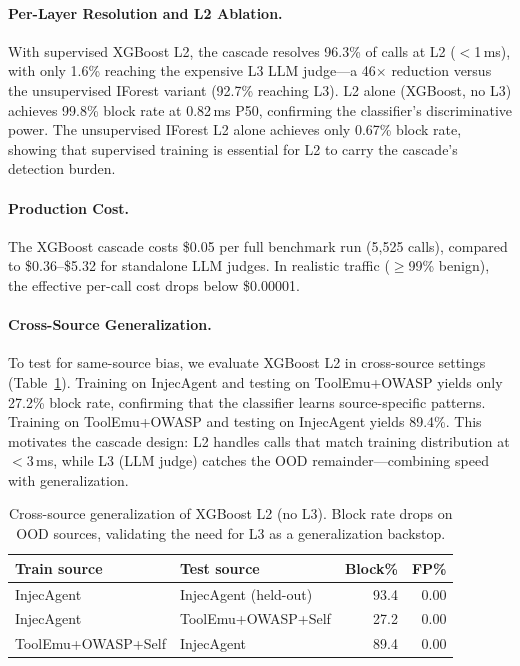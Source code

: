 \documentclass[11pt]{article}
\begin{document}


\paragraph{Per-Layer Resolution and L2 Ablation.}
With supervised XGBoost L2, the cascade resolves 96.3\% of calls at L2 ($<$1\,ms), with only 1.6\% reaching the expensive L3 LLM judge---a 46$\times$ reduction versus the unsupervised IForest variant (92.7\% reaching L3).
L2 alone (XGBoost, no L3) achieves 99.8\% block rate at 0.82\,ms P50, confirming the classifier's discriminative power.
The unsupervised IForest L2 alone achieves only 0.67\% block rate, showing that supervised training is essential for L2 to carry the cascade's detection burden.

\paragraph{Production Cost.}
The XGBoost cascade costs \$0.05 per full benchmark run (5{,}525 calls), compared to \$0.36--\$5.32 for standalone LLM judges.
In realistic traffic ($\ge$99\% benign), the effective per-call cost drops below \$0.00001.

\paragraph{Cross-Source Generalization.}
To test for same-source bias, we evaluate XGBoost L2 in cross-source settings (Table~\ref{tab:xsource}).
Training on InjecAgent and testing on ToolEmu+OWASP yields only 27.2\% block rate, confirming that the classifier learns source-specific patterns.
Training on ToolEmu+OWASP and testing on InjecAgent yields 89.4\%.
This motivates the cascade design: L2 handles calls that match training distribution at $<$3\,ms, while L3 (LLM judge) catches the OOD remainder---combining speed with generalization.

\begin{table}[t]
\centering\small
\caption{Cross-source generalization of XGBoost L2 (no L3). Block rate drops on OOD sources, validating the need for L3 as a generalization backstop.}
\vspace{-0.1in}
\label{tab:xsource}
\begin{tabular}{llrr}
\toprule
Train source & Test source & Block\% & FP\% \\
\midrule
InjecAgent & InjecAgent (held-out) & 93.4 & 0.00 \\
InjecAgent & ToolEmu+OWASP+Self & 27.2 & 0.00 \\
ToolEmu+OWASP+Self & InjecAgent & 89.4 & 0.00 \\
\bottomrule
\end{tabular}
\vspace{-0.1in}
\end{table}
\end{document}
